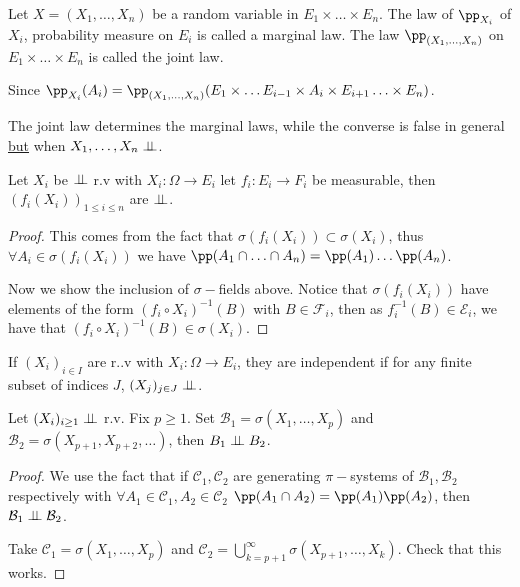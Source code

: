 \documentclass[../main.tex]{subfiles}
\begin{document}
\begin{definition}
    Let $X=(X_1, \ldots, X_n)$ be a random variable in $E_1 \times \ldots \times E_n$. The law
    of $\pp_{X_i}$ of $X_i$, probability measure on $E_i$ is called a marginal law. The law
    $\pp_{(X_1, \ldots, X_n)}$ on $E_1 \times \ldots \times E_n $ is called the joint law.

    Since $\pp_{X_i}(A_i) = \pp_{(X_1, \ldots, X_n)}(E_1 \times \ldots E_{i-1} \times A_i
    \times E_{i + 1} \ldots \times E_n)$.
\end{definition}

The joint law determines the marginal laws, while the converse is false in general
\underline{but} when $X_1, \ldots, X_n \perp\!\!\!\!\,\perp$.

\begin{lemma}
  Let $X_i$ be $\perp\!\!\!\!\,\perp$ r.v with $X_i \colon \Omega \to E_i$ let $f_i \colon E_i \to F_i$ be measurable,
  then $(f_i(X_i))_{1 \leq i \leq n}$ are $\perp\!\!\!\!\,\perp$.
\end{lemma}
\begin{proof}
    This comes from the fact that $\sigma(f_i(X_i)) \subset\sigma(X_i)$, thus $\forall A_i \in
    \sigma(f_i(X_i))$ we have $\pp(A_1 \cap \ldots \cap A_n) = \pp(A_1) \ldots \pp(A_n)$.

    Now we show the inclusion of $\sigma-$fields above. Notice that
    $\sigma(f_i(X_i))$ have elements of the form $(f_i \circ X_i)^{-1}(B)$ with $B \in
    \mathcal{F}_i$, then as $f_i^{-1}(B) \in \mathcal{E}_i$, we have that 
    $(f_i \circ X_i)^{-1}(B) \in \sigma(X_i)$.
\end{proof}

\begin{definition}
  If $(X_i)_{i \in I}$ are r..v with $X_i \colon \Omega \to E_i$, they are independent if for
  any finite subset of indices $J$, $(X_j)_{j \in J} \perp\!\!\!\!\,\perp$.
\end{definition}

\begin{lemma}
  Let $(X_i)_{i \geq 1} \perp\!\!\!\!\,\perp$ r.v. Fix $p \geq 1$. Set $\mathcal{B}_1 = \sigma(X_1, \ldots,
  X_p)$ and $\mathcal{B}_2 = \sigma(X_{p+1}, X_{p+2},\ldots)$, then $B_1 \perp\!\!\!\!\,\perp B_2$.
\end{lemma}

\begin{proof}
    We use the fact that if $\mathcal{C}_1, \mathcal{C}_2$ are generating $\pi-$systems of
    $\mathcal{B}_1, \mathcal{B}_2$ respectively with $\forall A_1 \in \mathcal{C}_1, A_2 \in
    \mathcal{C}_2$ $\pp(A_1 \cap A_2) = \pp(A_1) \pp(A_2)$, then $\mathcal{B}_1 \perp\!\!\!\!\,\perp
    \mathcal{B}_2$.

    \vspace{0.5em}

    Take $\mathcal{C}_1 = \sigma(X_1, \ldots, X_p)$ and $\mathcal{C}_2 = \bigcup_{k =
    p+1}^\infty \sigma(X_{p + 1}, \ldots, X_k)$. Check that this works. 
\end{proof}
\end{document}

